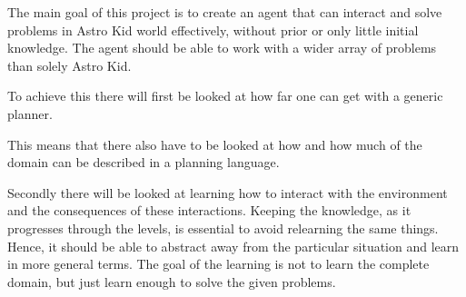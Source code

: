 	The main goal of this project is to create an agent that can interact and solve problems in Astro Kid world effectively, without prior or only little initial knowledge. The agent should be able to work with a wider array of problems than solely Astro Kid. 

	To achieve this there will first be looked at how far one can get with a generic planner. 
	
	This means that there also have to be looked at how and how much of the domain can be described in a planning language. 

	Secondly there will be looked at learning how to interact with the environment and the consequences of these interactions. Keeping the knowledge, as it progresses through the levels, is essential to avoid relearning the same things. Hence, it should be able to abstract away from the particular situation and learn in more general terms.  The goal of the learning is not to learn the complete domain, but just learn enough to solve the given problems. %

%
